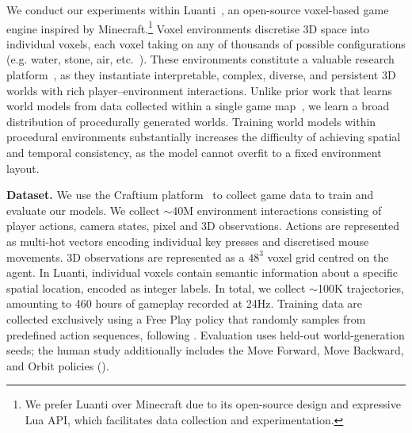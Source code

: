% 

We conduct our experiments within Luanti~\citep{luanti2024}, an open-source voxel-based game engine inspired by Minecraft.\footnote{We prefer Luanti over Minecraft due to its open-source design and expressive Lua API, which facilitates data collection and experimentation.} Voxel environments discretise 3D space into individual voxels, each voxel taking on any of thousands of possible configurations (e.g. water, stone, air, etc.\ ). These environments constitute a valuable research platform~\citep{malagon2025craftium,fan2022minedojo,guss2019minerl,baker2022video}, as they instantiate interpretable, complex, diverse, and persistent 3D worlds with rich player–environment interactions. Unlike prior work that learns world models from data collected within a single game map~\citep{alonso2024diffusion,kanervisto2025world}, we learn a broad distribution of procedurally generated worlds. Training world models within procedural environments substantially increases the difficulty of achieving spatial and temporal consistency, as the model cannot overfit to a fixed environment layout.


\textbf{Dataset.} We use the Craftium platform~\citep{malagon2025craftium} to collect game data to train and evaluate our models. We collect $\sim$40M environment interactions consisting of player actions, camera states, pixel and 3D observations. Actions are represented as multi-hot vectors encoding individual key presses and discretised mouse movements. 3D observations are represented as a $48^3$ voxel grid centred on the agent. In Luanti, individual voxels contain semantic information about a specific spatial location, encoded as integer labels. In total, we collect $\sim$100K trajectories, amounting to 460 hours of gameplay recorded at 24Hz. 
Training data are collected exclusively using a Free Play policy that randomly samples from predefined action sequences, following \citet{yu2025gamefactory}. Evaluation uses held-out world-generation seeds; the human study additionally includes the Move Forward, Move Backward, and Orbit policies (). %

